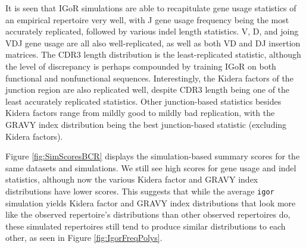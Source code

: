 \documentclass{article}
\begin{document}
It is seen that IGoR simulations are able to recapitulate gene usage statistics of an empirical repertoire very well, with J gene usage frequency being the most accurately replicated, followed by various indel length statistics.
V, D, and joing VDJ gene usage are all also well-replicated, as well as both VD and DJ insertion matrices.
The CDR3 length distribution is the least-replicated statistic, although the level of discrepancy is perhaps compounded by training IGoR on both functional and nonfunctional sequences.
Interestingly, the Kidera factors of the junction region are also replicated well, despite CDR3 length being one of the least accurately replicated statistics.
Other junction-based statistics besides Kidera factors range from mildly good to mildly bad replication, with the GRAVY index distribution being the best junction-based statistic (excluding Kidera factors).

Figure \ref{fig:SimScoresBCR} displays the simulation-based summary scores for the same datasets and simulations.
We still see high scores for gene usage and indel statistics, although now the various Kidera factor and GRAVY index distributions have lower scores.
This suggests that while the average \texttt{igor} simulation yields Kidera factor and GRAVY index distributions that look more like the observed repertoire's distributions than other observed repertoires do, these simulated repertoires still tend to produce similar distributions to each other, as seen in Figure \ref{fig:IgorFreqPolys}.
\end{document}
